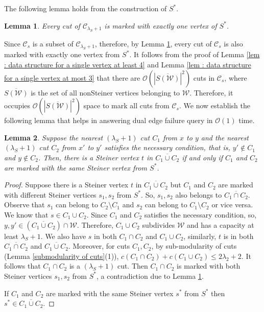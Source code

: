 \documentclass[letterpaper,11pt]{article}
\newtheorem{lemma}{Lemma}[]
\begin{document}
The following lemma holds from the construction of $S^*$.
\begin{lemma} \label{lem : a cut is marked with exactly one steiner vertex}
    Every cut of ${\mathcal C}_{\lambda_S+1}$ is marked with exactly one vertex of $S^*$. 
\end{lemma}
Since ${\mathcal C}_s$ is a subset of ${\mathcal C}_{\lambda_S+1}$, therefore, by Lemma \ref{lem : a cut is marked with exactly one steiner vertex}, every cut of ${\mathcal C}_s$ is also marked with exactly one vertex from $S^*$. It follows from the proof of Lemma \ref{lem : data structure for a single vertex at least 4} and Lemma \ref{lem : data structure for a single vertex at most 3} that there are ${\mathcal O}(|\overline{S({\mathcal W})}|^2)$ cuts in ${\mathcal C}_s$, where $\overline{S({\mathcal W})}$ is the set of all nonSteiner vertices belonging to ${\mathcal W}$. Therefore, it occupies ${\mathcal O}(|\overline{S({\mathcal W})}|^2)$ space to mark all cuts from ${\mathcal C}_s$. We now establish the following lemma that helps in answering dual edge failure query in ${\mathcal O}(1)$ time.
\begin{lemma} \label{lem : verifying third condition in constant}
    Suppose the nearest $(\lambda_S+1)$ cut $C_1$ from $x$ to $y$ and the nearest $(\lambda_S+1)$ cut $C_2$ from $x'$ to $y'$ satisfies the necessary condition, that is, $y'\notin  C_1$ and $y\notin C_2$. Then, there is a Steiner vertex $t$ in $\overline{C_1\cup C_2}$ if and only if $C_1$ and $C_2$ are marked with the same Steiner vertex from $S^*$.
\end{lemma}
\begin{proof}
    Suppose there is a Steiner vertex $t$ in $\overline{C_1\cup C_2}$ but $C_1$ and $C_2$ are marked with different Steiner vertices $s_1,s_2$ from $S^*$. So, $s_1,s_2$ also belongs to $\overline{C_1\cap C_2}$. Observe that $s_1$ can belong to $C_2\setminus C_1$ and $s_2$ can belong to $C_1\setminus C_2$ or vice versa. We know that $s\in C_1\cup C_2$. Since $C_1$ and $C_2$ satisfies the necessary condition, so, $y,y'\in (\overline{C_1\cup C_2})\cap {\mathcal W}$. Therefore, $C_1\cup C_2$ subdivides ${\mathcal W}$ and has a capacity at least $\lambda_S+1$. We also have $s$ in both $C_1\cap C_2$ and $C_1\cup C_2$, similarly, $t$ is in both  $\overline{C_1\cap C_2}$ and $\overline{C_1\cup C_2}$. Moreover, for cuts $C_1,C_2$, by sub-modularity of cuts (Lemma \ref{submodularity of cuts}(1)), $c(C_1\cap C_2)+c(C_1\cup C_2)\le 2\lambda_2+2$. It follows that $C_1\cap C_2$ is a $(\lambda_S+1)$ cut. Then $C_1\cap C_2$ is marked with both Steiner vertices $s_1,s_2$ from $S^*$, a contradiction due to Lemma \ref{lem : a cut is marked with exactly one steiner vertex}.
    


    If $C_1$ and $C_2$ are marked with the same Steiner vertex $s^*$ from $S^*$ then $s^*\in \overline{C_1\cup C_2}$.
\end{proof}
\end{document}
